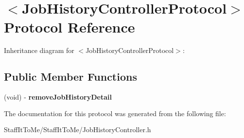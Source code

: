 \hypertarget{protocol_job_history_controller_protocol-p}{
\section{$<$\-Job\-History\-Controller\-Protocol$>$ \-Protocol \-Reference}
\label{protocol_job_history_controller_protocol-p}
}


\-Inheritance diagram for $<$\-Job\-History\-Controller\-Protocol$>$\-:
\subsection*{\-Public \-Member \-Functions}
\begin{DoxyCompactItemize}
\item 
\hypertarget{protocol_job_history_controller_protocol-p_a0c5fef5b604bbf1373b52b7776f5296b}{
(void) -\/ {\bfseries remove\-Job\-History\-Detail}}
\label{protocol_job_history_controller_protocol-p_a0c5fef5b604bbf1373b52b7776f5296b}

\end{DoxyCompactItemize}


\-The documentation for this protocol was generated from the following file\-:\begin{DoxyCompactItemize}
\item 
\-Staff\-It\-To\-Me/\-Staff\-It\-To\-Me/\-Job\-History\-Controller.\-h\end{DoxyCompactItemize}
